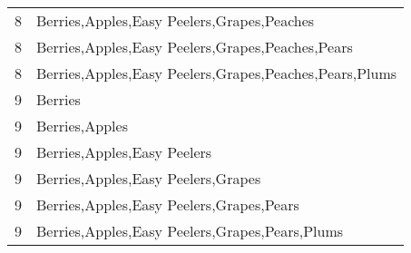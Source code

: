 \documentclass[11pt]{article}
\begin{document}
\begin{table}[h]
\begin{center}
\begin{tabular}{ll}
8 & Berries,Apples,Easy Peelers,Grapes,Peaches \\
8 & Berries,Apples,Easy Peelers,Grapes,Peaches,Pears \\
8 & Berries,Apples,Easy Peelers,Grapes,Peaches,Pears,Plums \\
9 & Berries \\
9 & Berries,Apples \\
9 & Berries,Apples,Easy Peelers \\
9 & Berries,Apples,Easy Peelers,Grapes \\
9 & Berries,Apples,Easy Peelers,Grapes,Pears \\
9 & Berries,Apples,Easy Peelers,Grapes,Pears,Plums \\
\hline \hline
\end{tabular}
\end{center}
\end{table}
\end{document}
